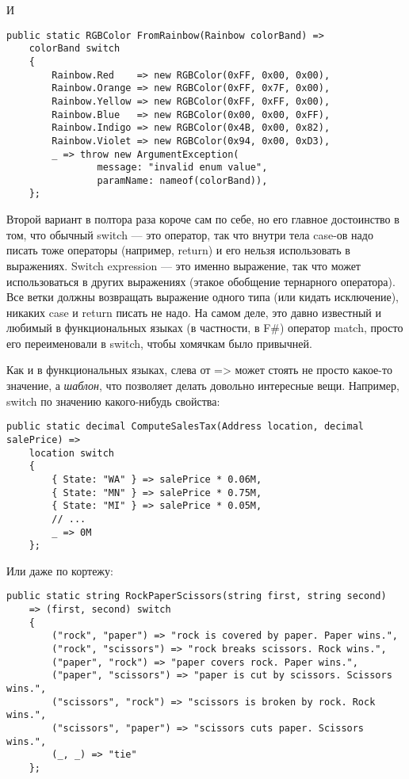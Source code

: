 \documentclass{../../text-style}
\begin{document}
И

\begin{verbatim}
public static RGBColor FromRainbow(Rainbow colorBand) =>
    colorBand switch
    {
        Rainbow.Red    => new RGBColor(0xFF, 0x00, 0x00),
        Rainbow.Orange => new RGBColor(0xFF, 0x7F, 0x00),
        Rainbow.Yellow => new RGBColor(0xFF, 0xFF, 0x00),
        Rainbow.Blue   => new RGBColor(0x00, 0x00, 0xFF),
        Rainbow.Indigo => new RGBColor(0x4B, 0x00, 0x82),
        Rainbow.Violet => new RGBColor(0x94, 0x00, 0xD3),
        _ => throw new ArgumentException(
                message: "invalid enum value", 
                paramName: nameof(colorBand)),
    };
\end{verbatim}

Второй вариант в полтора раза короче сам по себе, но его главное достоинство в том, что обычный switch --- это оператор, так что внутри тела case-ов надо писать тоже операторы (например, return) и его нельзя использовать в выражениях. Switch expression --- это именно выражение, так что может использоваться в других выражениях (этакое обобщение тернарного оператора). Все ветки должны возвращать выражение одного типа (или кидать исключение), никаких case и return писать не надо. На самом деле, это давно известный и любимый в функциональных языках (в частности, в F\#) оператор match, просто его переименовали в switch, чтобы хомячкам было привычней.

Как и в функциональных языках, слева от => может стоять не просто какое-то значение, а \textit{шаблон}, что позволяет делать довольно интересные вещи. Например, switch по значению какого-нибудь свойства:

\begin{verbatim}
public static decimal ComputeSalesTax(Address location, decimal salePrice) =>
    location switch
    {
        { State: "WA" } => salePrice * 0.06M,
        { State: "MN" } => salePrice * 0.75M,
        { State: "MI" } => salePrice * 0.05M,
        // ...
        _ => 0M
    };
\end{verbatim}

Или даже по кортежу:

\begin{verbatim}
public static string RockPaperScissors(string first, string second)
    => (first, second) switch
    {
        ("rock", "paper") => "rock is covered by paper. Paper wins.",
        ("rock", "scissors") => "rock breaks scissors. Rock wins.",
        ("paper", "rock") => "paper covers rock. Paper wins.",
        ("paper", "scissors") => "paper is cut by scissors. Scissors wins.",
        ("scissors", "rock") => "scissors is broken by rock. Rock wins.",
        ("scissors", "paper") => "scissors cuts paper. Scissors wins.",
        (_, _) => "tie"
    };
\end{verbatim}
\end{document}
